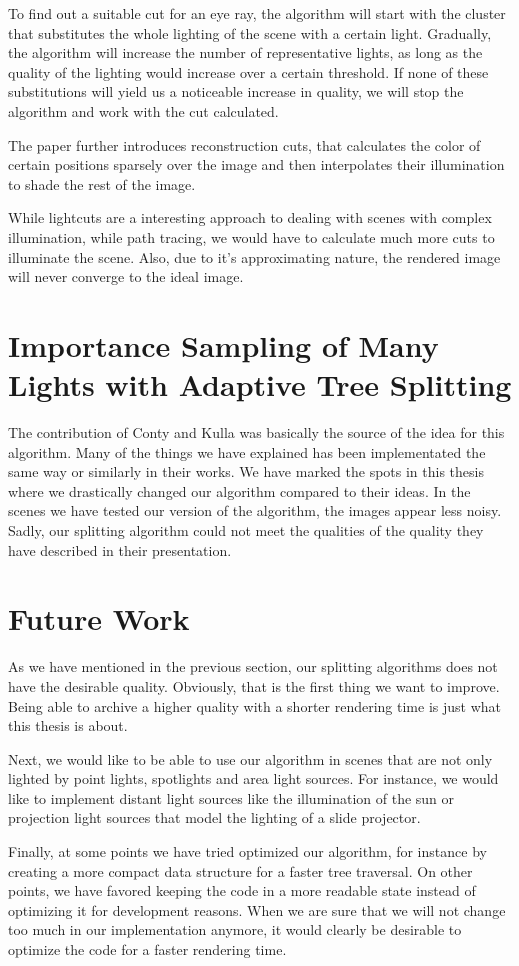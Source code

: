 To find out a suitable cut for an eye ray, the algorithm will start with the cluster that substitutes the whole lighting of the scene with a certain light. Gradually, the algorithm will increase the number of representative lights, as long as the quality of the lighting would increase over a certain threshold. If none of these substitutions will yield us a noticeable increase in quality, we will stop the algorithm and work with the cut calculated.

The paper further introduces reconstruction cuts, that calculates the color of certain positions sparsely over the image and then interpolates their illumination to shade the rest of the image.

While lightcuts are a interesting approach to dealing with scenes with complex illumination, while path tracing, we would have to calculate much more cuts to illuminate the scene. Also, due to it's approximating nature, the rendered image will never converge to the ideal image.

\section{Importance Sampling of Many Lights with Adaptive Tree Splitting}

The contribution of Conty and Kulla \Cite{MLA,MLS} was basically the source of the idea for this algorithm. Many of the things we have explained has been implementated the same way or similarly in their works. We have marked the spots in this thesis where we drastically changed our algorithm compared to their ideas. In the scenes we have tested our version of the algorithm, the images appear less noisy. Sadly, our splitting algorithm could not meet the qualities of the quality they have described in their presentation.

\section{Future Work}

As we have mentioned in the previous section, our splitting algorithms does not have the desirable quality. Obviously, that is the first thing we want to improve. Being able to archive a higher quality with a shorter rendering time is just what this thesis is about.

Next, we would like to be able to use our algorithm in scenes that are not only lighted by point lights, spotlights and area light sources. For instance, we would like to implement distant light sources like the illumination of the sun or projection light sources that model the lighting of a slide projector.

Finally, at some points we have tried optimized our algorithm, for instance by creating a more compact data structure for a faster tree traversal. On other points, we have favored keeping the code in a more readable state instead of optimizing it for development reasons. When we are sure that we will not change too much in our implementation anymore, it would clearly be desirable to optimize the code for a faster rendering time.